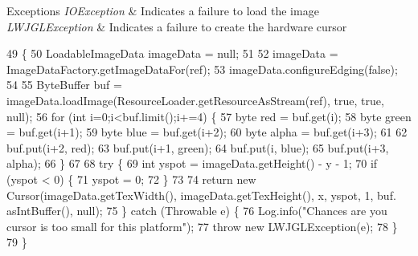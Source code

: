 \begin{DoxyExceptions}{Exceptions}
{\em I\+O\+Exception} & Indicates a failure to load the image \\
\hline
{\em L\+W\+J\+G\+L\+Exception} & Indicates a failure to create the hardware cursor \\
\hline
\end{DoxyExceptions}

\begin{DoxyCode}
49                                                                                        \{
50         LoadableImageData imageData = null;
51         
52         imageData = ImageDataFactory.getImageDataFor(ref);
53         imageData.configureEdging(\textcolor{keyword}{false});
54         
55         ByteBuffer buf = imageData.loadImage(ResourceLoader.getResourceAsStream(ref), \textcolor{keyword}{true}, \textcolor{keyword}{true}, null);
56         \textcolor{keywordflow}{for} (\textcolor{keywordtype}{int} i=0;i<buf.limit();i+=4) \{
57             byte red = buf.get(i);
58             byte green = buf.get(i+1);
59             byte blue = buf.get(i+2);
60             byte alpha = buf.get(i+3);
61             
62             buf.put(i+2, red);
63             buf.put(i+1, green);
64             buf.put(i, blue);
65             buf.put(i+3, alpha);
66         \}
67         
68         \textcolor{keywordflow}{try} \{
69             \textcolor{keywordtype}{int} yspot = imageData.getHeight() - y - 1;
70             \textcolor{keywordflow}{if} (yspot < 0) \{
71                 yspot = 0;
72             \}
73             
74             \textcolor{keywordflow}{return} \textcolor{keyword}{new} Cursor(imageData.getTexWidth(), imageData.getTexHeight(), x, yspot, 1, buf.
      asIntBuffer(), null);
75         \} \textcolor{keywordflow}{catch} (Throwable e) \{
76             Log.info(\textcolor{stringliteral}{"Chances are you cursor is too small for this platform"});
77             \textcolor{keywordflow}{throw} \textcolor{keyword}{new} LWJGLException(e);
78         \}
79     \}
\end{DoxyCode}
\mbox{\label{classorg_1_1newdawn_1_1slick_1_1opengl_1_1_cursor_loader_a12f03f9c48a6ce9d08e8fb7e0dbb0e44}} 
